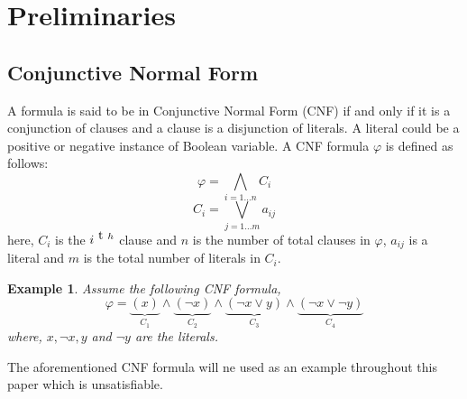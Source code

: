 \newtheorem{example}{Example}
\section{Preliminaries}
\label{sec:preliminaries}
\subsection{Conjunctive Normal Form}
A formula is said to be in Conjunctive Normal Form (CNF) if and only if it is a conjunction of clauses and a clause is a disjunction of literals. A literal could be a positive or negative instance of Boolean variable. A CNF formula $\varphi$ is defined as follows:
$$\varphi = \bigwedge\limits_{i=1\ldots n} C_{i}$$
$$ C_{i} = \bigvee\limits_{j=1\ldots m} a_{ij}$$
here, $C_{i}$ is the $i^{\text th}$ clause and $n$ is the number of total clauses in $\varphi$, $a_{ij}$ is a literal and $m$ is the total number of literals in $C_{i}$.\newline
\begin{example}
	Assume the following CNF formula,
	$$\varphi=\underbrace{(x)}\limits_{C_{1}}\wedge\underbrace{(\neg x)}\limits_{C_2}\wedge\underbrace{(\neg x\vee y)}\limits_{C_{3}}\wedge\underbrace{(\neg x \vee \neg y)}\limits_{C_{4}}$$
	where, $x, \neg x, y$ and $\neg y$ are the literals.
\end{example}
The aforementioned CNF formula will ne used as an example throughout this paper which is unsatisfiable.
